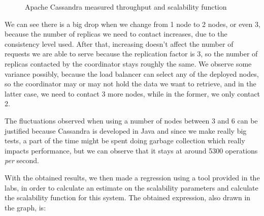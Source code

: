 \documentclass[runningheads]{llncs}
\begin{document}
\begin{figure}
    \begin{center}
    \end{center}
    \caption{Apache Cassandra measured throughput and scalability function}
\end{figure}

We can see there is a big drop when we change from 1 node to 2 nodes, or even 3, because the number of replicas we need to contact increases, due to the consistency level used. After that, increasing doesn't affect the number of requests we are able to serve because the replication factor is 3, so the number of replicas contacted by the coordinator stays roughly the same.
We observe some variance possibly, because the load balancer can select any of the deployed nodes, so the coordinator may or may not hold the data we want to retrieve, and in the latter case, we need to contact 3 more nodes, while in the former, we only contact 2.\par

The fluctuations observed when using a number of nodes between 3 and 6 can be justified because Cassandra is developed in Java and since we make really big tests, a part of the time might be spent doing garbage collection which really impacts performance, but we can observe that it stays at around 5300 operations \textit{per} second. \par

With the obtained results, we then made a regression using a tool provided in the labs, in order to calculate an estimate on the scalability parameters and calculate the scalability function for this system. The obtained expression, also drawn in the graph, is:
\end{document}
